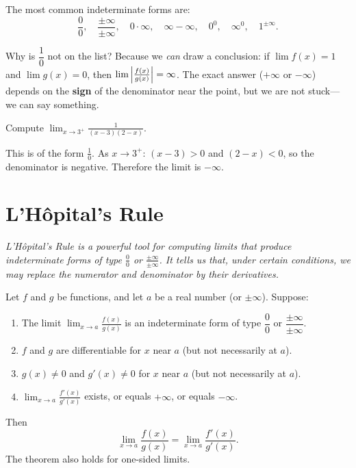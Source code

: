 The most common indeterminate forms are:
\[
  \frac{0}{0},\quad \frac{\pm\infty}{\pm\infty},\quad 0\cdot\infty,\quad \infty - \infty,\quad 0^{0},\quad \infty^{0},\quad 1^{\pm\infty}.
\]

\begin{remark}
Why is $\dfrac{1}{0}$ not on the list?  Because we \emph{can} draw a conclusion: if $\lim f(x) = 1$ and $\lim g(x) = 0$, then $\lim\left\lvert \frac{f(x)}{g(x)} \right\rvert = \infty$.  The exact answer ($+\infty$ or $-\infty$) depends on the \textbf{sign} of the denominator near the point, but we are not stuck---we can say something.
\end{remark}

\begin{example}
\label{ex:6-5}
Compute $\displaystyle\lim_{x \to 3^{+}}\frac{1}{(x - 3)(2 - x)}$.

This is of the form $\frac{1}{0}$.  As $x \to 3^{+}$: $(x-3) > 0$ and $(2-x) < 0$, so the denominator is negative.  Therefore the limit is $-\infty$.
\end{example}

\section{L'H\^opital's Rule}
\label{sec:6.6}

\textit{L'H\^opital's Rule is a powerful tool for computing limits that produce indeterminate forms of type $\frac{0}{0}$ or $\frac{\pm\infty}{\pm\infty}$.  It tells us that, under certain conditions, we may replace the numerator and denominator by their derivatives.}

\begin{theorem}
\label{thm:6-1}
Let $f$ and $g$ be functions, and let $a$ be a real number (or $\pm\infty$).  Suppose:
\begin{enumerate}[label=(\roman*)]
  \item The limit $\displaystyle\lim_{x \to a}\frac{f(x)}{g(x)}$ is an indeterminate form of type $\dfrac{0}{0}$ or $\dfrac{\pm\infty}{\pm\infty}$.
  \item $f$ and $g$ are differentiable for $x$ near $a$ (but not necessarily at $a$).
  \item $g(x) \neq 0$ and $g'(x) \neq 0$ for $x$ near $a$ (but not necessarily at $a$).
  \item $\displaystyle\lim_{x \to a}\frac{f'(x)}{g'(x)}$ exists, or equals $+\infty$, or equals $-\infty$.
\end{enumerate}
Then
\[
  \lim_{x \to a}\frac{f(x)}{g(x)} = \lim_{x \to a}\frac{f'(x)}{g'(x)}.
\]
The theorem also holds for one-sided limits.
\end{theorem}

